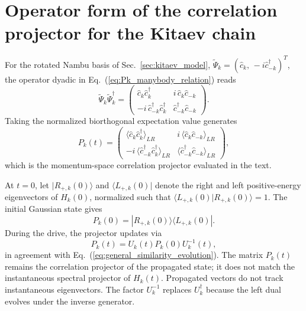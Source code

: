 \documentclass[aps,prb,reprint,superscriptaddress,amsmath,amssymb,floatfix]{revtex4-2}
\begin{document}
\section{Operator form of the correlation projector for the Kitaev chain}
\label{app:kitaev_projector_operator}

  For the rotated Nambu basis of Sec.~\ref{sec:kitaev_model}, $\widetilde\Psi_k = \left( \hat c_k,\, -i\hat c_{-k}^{\dagger} \right)^T$, the operator dyadic in Eq.~(\ref{eq:Pk_manybody_relation}) reads
\begin{equation}
\widetilde\Psi_k\widetilde\Psi_k^\dagger
=
\begin{pmatrix}
\hat c_k\hat c_k^\dagger
&
i\,\hat c_k\hat c_{-k}
\\[1mm]
-i\,\hat c_{-k}^\dagger\hat c_k^\dagger
&
\hat c_{-k}^\dagger\hat c_{-k}
\end{pmatrix}.
\label{eq:kitaev_operator_outer_product}
\end{equation}
Taking the normalized biorthogonal expectation value generates
\begin{equation}
P_k(t)
=
\begin{pmatrix}
\langle \hat c_k\hat c_k^\dagger\rangle_{LR}
&
i\,\langle \hat c_k\hat c_{-k}\rangle_{LR}
\\[1mm]
-i\,\langle \hat c_{-k}^\dagger\hat c_k^\dagger\rangle_{LR}
&
\langle \hat c_{-k}^\dagger\hat c_{-k}\rangle_{LR}
\end{pmatrix},
\label{eq:kitaev_operator_expectation}
\end{equation}
which is the momentum-space correlation projector evaluated in the text.

  At $t=0$, let $\vert{}R_{+,k}(0)\rangle$ and $\langle L_{+,k}(0)\vert{}$ denote the right and left positive-energy eigenvectors of $H_k(0)$, normalized such that $\langle L_{+,k}(0)\vert{}R_{+,k}(0)\rangle=1$. The initial Gaussian state gives
\begin{equation}
P_k(0)
=
|R_{+,k}(0)\rangle
\langle L_{+,k}(0)|.
\label{eq:kitaev_initial_spectral_projector}
\end{equation}
During the drive, the projector updates via
\begin{equation}
P_k(t)
=
U_k(t)P_k(0)U_k^{-1}(t),
\label{eq:kitaev_driven_projector_appendix}
\end{equation}
in agreement with Eq.~(\ref{eq:general_similarity_evolution}). The matrix $P_k(t)$ remains the correlation projector of the propagated state; it does not match the instantaneous spectral projector of $H_k(t)$. Propagated vectors do not track instantaneous eigenvectors. The factor $U_k^{-1}$ replaces $U_k^\dagger$ because the left dual evolves under the inverse generator.
\end{document}
